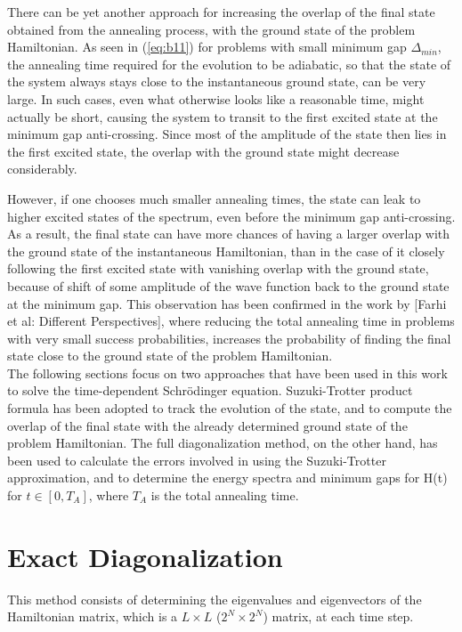\documentclass[12]{article}
\begin{document}
There can be yet another approach for increasing the overlap of the final state obtained from the annealing process, with the ground state of the problem Hamiltonian. As seen in (\ref{eq:b11}) for problems with small minimum gap $\Delta_{min}$, the annealing time required for the evolution to be adiabatic, so that the state of the system always stays close to the instantaneous ground state, can be very large. In such cases, even what otherwise looks like a reasonable time, might actually be short, causing the system to transit to the first excited state at the minimum gap anti-crossing. Since most of the amplitude of the state then lies in the first excited state, the overlap with the ground state might decrease considerably. 

However, if one chooses much smaller annealing times, the state can leak to higher excited states of the spectrum, even before the minimum gap anti-crossing. As a result, the final state can have more chances of having a larger overlap with the ground state of the instantaneous Hamiltonian, than in the case of it closely following the first excited state with vanishing overlap with the ground state, because of shift of some amplitude of the wave function back to the ground state at the minimum gap. This observation has been confirmed in the work by [Farhi et al: Different Perspectives], where reducing the total annealing time in problems with very small success probabilities, increases the probability of finding the final state close to the ground state of the problem Hamiltonian.\\

The following sections focus on two approaches that have been used in this work to solve the time-dependent Schr{\"o}dinger equation. Suzuki-Trotter product formula has been adopted to track the evolution of the state, and to compute the overlap of the final state with the already determined ground state of the problem Hamiltonian. The full diagonalization method, on the other hand, has been used to calculate the errors involved in using the Suzuki-Trotter approximation, and to determine the energy spectra and minimum gaps for H(t) for $t \in [0,T_A]$, where $T_A$ is the total annealing time.

\section{Exact Diagonalization}
This method consists of determining the eigenvalues and eigenvectors of the Hamiltonian matrix, which is a $L\times L$ ($2^N \times 2^N$) matrix, at each time step.
\end{document}
